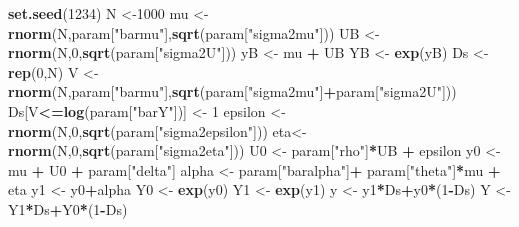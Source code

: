 \documentclass[]{book}
\newenvironment{Shaded}{\begin{snugshade}}{\end{snugshade}}
\newcommand{\KeywordTok}[1]{\textcolor[rgb]{0.13,0.29,0.53}{\textbf{#1}}}
\newcommand{\DecValTok}[1]{\textcolor[rgb]{0.00,0.00,0.81}{#1}}
\newcommand{\StringTok}[1]{\textcolor[rgb]{0.31,0.60,0.02}{#1}}
\newcommand{\OperatorTok}[1]{\textcolor[rgb]{0.81,0.36,0.00}{\textbf{#1}}}
\newcommand{\NormalTok}[1]{#1}
\theoremstyle{definition}
\theoremstyle{definition}
\theoremstyle{definition}
\theoremstyle{remark}
\begin{document}
\begin{Shaded}
\begin{Highlighting}[]
\KeywordTok{set.seed}\NormalTok{(}\DecValTok{1234}\NormalTok{)}
\NormalTok{N <-}\DecValTok{1000}
\NormalTok{mu <-}\StringTok{ }\KeywordTok{rnorm}\NormalTok{(N,param[}\StringTok{"barmu"}\NormalTok{],}\KeywordTok{sqrt}\NormalTok{(param[}\StringTok{"sigma2mu"}\NormalTok{]))}
\NormalTok{UB <-}\StringTok{ }\KeywordTok{rnorm}\NormalTok{(N,}\DecValTok{0}\NormalTok{,}\KeywordTok{sqrt}\NormalTok{(param[}\StringTok{"sigma2U"}\NormalTok{]))}
\NormalTok{yB <-}\StringTok{ }\NormalTok{mu }\OperatorTok{+}\StringTok{ }\NormalTok{UB }
\NormalTok{YB <-}\StringTok{ }\KeywordTok{exp}\NormalTok{(yB)}
\NormalTok{Ds <-}\StringTok{ }\KeywordTok{rep}\NormalTok{(}\DecValTok{0}\NormalTok{,N)}
\NormalTok{V <-}\StringTok{ }\KeywordTok{rnorm}\NormalTok{(N,param[}\StringTok{"barmu"}\NormalTok{],}\KeywordTok{sqrt}\NormalTok{(param[}\StringTok{"sigma2mu"}\NormalTok{]}\OperatorTok{+}\NormalTok{param[}\StringTok{"sigma2U"}\NormalTok{]))}
\NormalTok{Ds[V}\OperatorTok{<=}\KeywordTok{log}\NormalTok{(param[}\StringTok{"barY"}\NormalTok{])] <-}\StringTok{ }\DecValTok{1} 
\NormalTok{epsilon <-}\StringTok{ }\KeywordTok{rnorm}\NormalTok{(N,}\DecValTok{0}\NormalTok{,}\KeywordTok{sqrt}\NormalTok{(param[}\StringTok{"sigma2epsilon"}\NormalTok{]))}
\NormalTok{eta<-}\StringTok{ }\KeywordTok{rnorm}\NormalTok{(N,}\DecValTok{0}\NormalTok{,}\KeywordTok{sqrt}\NormalTok{(param[}\StringTok{"sigma2eta"}\NormalTok{]))}
\NormalTok{U0 <-}\StringTok{ }\NormalTok{param[}\StringTok{"rho"}\NormalTok{]}\OperatorTok{*}\NormalTok{UB }\OperatorTok{+}\StringTok{ }\NormalTok{epsilon}
\NormalTok{y0 <-}\StringTok{ }\NormalTok{mu }\OperatorTok{+}\StringTok{  }\NormalTok{U0 }\OperatorTok{+}\StringTok{ }\NormalTok{param[}\StringTok{"delta"}\NormalTok{]}
\NormalTok{alpha <-}\StringTok{ }\NormalTok{param[}\StringTok{"baralpha"}\NormalTok{]}\OperatorTok{+}\StringTok{  }\NormalTok{param[}\StringTok{"theta"}\NormalTok{]}\OperatorTok{*}\NormalTok{mu }\OperatorTok{+}\StringTok{ }\NormalTok{eta}
\NormalTok{y1 <-}\StringTok{ }\NormalTok{y0}\OperatorTok{+}\NormalTok{alpha}
\NormalTok{Y0 <-}\StringTok{ }\KeywordTok{exp}\NormalTok{(y0)}
\NormalTok{Y1 <-}\StringTok{ }\KeywordTok{exp}\NormalTok{(y1)}
\NormalTok{y <-}\StringTok{ }\NormalTok{y1}\OperatorTok{*}\NormalTok{Ds}\OperatorTok{+}\NormalTok{y0}\OperatorTok{*}\NormalTok{(}\DecValTok{1}\OperatorTok{-}\NormalTok{Ds)}
\NormalTok{Y <-}\StringTok{ }\NormalTok{Y1}\OperatorTok{*}\NormalTok{Ds}\OperatorTok{+}\NormalTok{Y0}\OperatorTok{*}\NormalTok{(}\DecValTok{1}\OperatorTok{-}\NormalTok{Ds)}
\end{Highlighting}
\end{Shaded}
\end{document}
